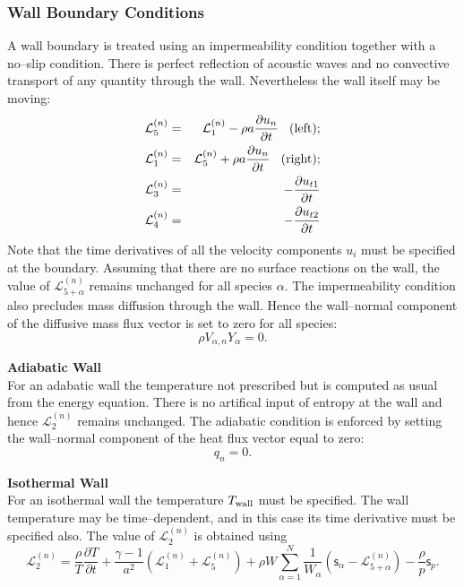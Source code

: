 \documentclass[dvips]{article}
\begin{document}
\subsubsection{Wall Boundary Conditions}
A wall boundary is treated using an impermeability condition together
with a no--slip condition.  There is perfect reflection of acoustic waves
and no convective transport of any quantity through the wall.  Nevertheless
the wall itself may be moving:
\begin{eqnarray}
{\mathcal L}^{(n)}_{5} & = &
{\mathcal L}^{(n)}_{1} - \rho a\frac{\partial u_{n}}{\partial t}
\hspace{3mm}{\rm (left);}
\nonumber \\
{\mathcal L}^{(n)}_{1} & = &
{\mathcal L}^{(n)}_{5} + \rho a\frac{\partial u_{n}}{\partial t}
\hspace{3mm}{\rm (right);}
\nonumber \\
{\mathcal L}^{(n)}_{3} & = &
-\frac{\partial u_{t1}}{\partial t}
\nonumber \\
{\mathcal L}^{(n)}_{4} & = &
-\frac{\partial u_{t2}}{\partial t}
\label{NSCBCWALLALL}
\end{eqnarray}
Note that the time derivatives of all the velocity components $u_{i}$ must
be specified at the boundary.  Assuming that there are no surface reactions
on the wall, the value of ${\mathcal L}^{(n)}_{5+\alpha}$ remains unchanged
for all species $\alpha$.
The impermeability condition also precludes mass diffusion through the wall.
Hence the wall--normal component of the diffusive mass flux vector is set to
zero for all species:
\begin{equation}
\rho V_{\alpha,n} Y_{\alpha} = 0.
\end{equation}

\vspace{2mm}
\noindent
{\bf Adiabatic Wall}\\
For an adabatic wall the temperature not prescribed but is computed as
usual from the energy equation.  There is no artifical input of entropy at the
wall and hence ${\mathcal L}^{(n)}_{2}$ remains unchanged.  The adiabatic
condition is enforced by setting the wall--normal component of the heat flux
vector equal to zero: 
\begin{equation}
q_{n} = 0.
\end{equation}

\vspace{2mm}
\noindent
{\bf Isothermal Wall}\\
For an isothermal wall the temperature $T_{\rm wall}$ must be
specified.  The wall temperature may be time--dependent, and in this
case its time derivative must be specified also.  The value of
${\mathcal L}^{(n)}_{2}$ is obtained using
\begin{equation}
{\mathcal L}^{(n)}_{2} = 
\frac{\rho}{T}\frac{\partial T}{\partial t}
+\frac{\gamma-1}{a^{2}}
\left({\mathcal L}^{(n)}_{1}+{\mathcal L}^{(n)}_{5}\right)
+\rho W\sum_{\alpha=1}^{N}\frac{1}{W_{\alpha}}
\left({\mathsf s}_{\alpha}-{\mathcal L}^{(n)}_{5+\alpha}\right)
-\frac{\rho}{p}{\mathsf s}_{p}.
\label{NSCBCWALLTEMP}
\end{equation}
\end{document}
